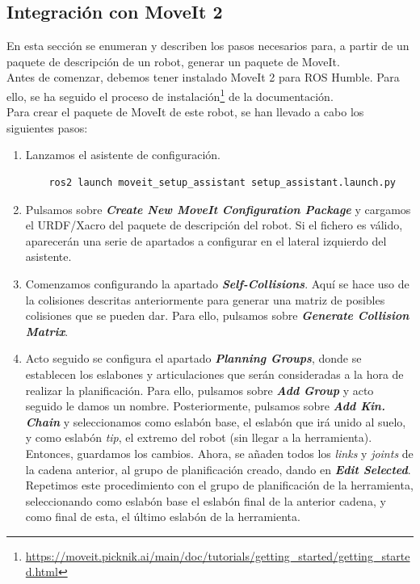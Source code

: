 \newpage
\subsection{Integración con MoveIt 2}
\noindent En esta sección se enumeran y describen los pasos necesarios para, a partir de un paquete de descripción de un robot, generar 
un paquete de MoveIt.
\\
Antes de comenzar, debemos tener instalado MoveIt 2 para ROS Humble. Para ello, se ha seguido el proceso de 
instalación\footnote{\url{https://moveit.picknik.ai/main/doc/tutorials/getting_started/getting_started.html}} de la documentación.
\\

Para crear el paquete de MoveIt de este robot, se han llevado a cabo los siguientes pasos:
\begin{enumerate}
\item Lanzamos el asistente de configuración.
\begin{verbatim}
    ros2 launch moveit_setup_assistant setup_assistant.launch.py
\end{verbatim}
\item Pulsamos sobre \textbf{\textit{\guillemotleft Create New MoveIt Configuration Package\guillemotright}} y cargamos el URDF/Xacro del paquete de descripción 
del robot. Si el fichero es válido, aparecerán una serie de apartados a configurar en el lateral izquierdo del asistente. 
\item Comenzamos configurando la apartado \textbf{\textit{\guillemotleft Self-Collisions\guillemotright}}. Aquí se hace uso de la colisiones 
descritas anteriormente para generar una matriz de posibles colisiones que se pueden dar. Para ello, pulsamos sobre
\textbf{\textit{\guillemotleft Generate Collision Matrix\guillemotright}}.
\item Acto seguido se configura el apartado \textbf{\textit{\guillemotleft Planning Groups\guillemotright}}, donde se establecen los eslabones y articulaciones que serán consideradas 
a la hora de realizar la planificación. Para ello, pulsamos sobre \textbf{\textit{\guillemotleft Add Group\guillemotright}} y acto seguido 
le damos un nombre. Posteriormente, pulsamos sobre \textbf{\textit{\guillemotleft Add Kin. Chain\guillemotright}} y seleccionamos como 
eslabón base, el eslabón que irá unido al suelo, y como eslabón \textit{tip}, el extremo del robot (sin llegar a la herramienta). Entonces, guardamos los cambios. Ahora, 
se añaden todos los \textit{links} y \textit{joints} de la cadena anterior, al grupo de planificación creado, dando en \textbf{\textit{\guillemotleft Edit Selected\guillemotright}}.
Repetimos este procedimiento con el grupo de planificación de la herramienta, seleccionando como eslabón base el eslabón final de la anterior cadena, y como 
final de esta, el último eslabón de la herramienta. 


\end{enumerate}
